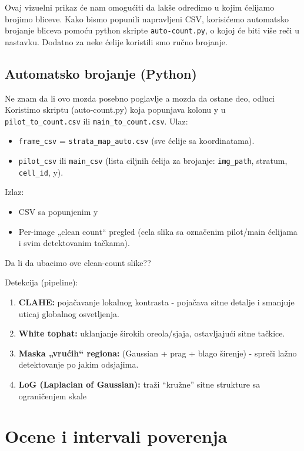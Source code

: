\documentclass[a4paper,12pt]{article}
\begin{document}
\noindent
Ovaj vizuelni prikaz će nam omogućiti da lakše odredimo u kojim ćelijamo brojimo bliceve. 
Kako bismo popunili napravljeni CSV, korisićemo automatsko brojanje bliceva pomoću python skripte \texttt{auto-count.py}, o kojoj će biti više
reči u nastavku. Dodatno za neke ćelije koristili smo ručno brojanje.


\subsection{Automatsko brojanje (Python)}
Ne znam da li ovo mozda posebno poglavlje a mozda da ostane deo, odluci
\newline
\newline
\noindent
Koristimo skriptu (auto-count.py) koja popunjava kolonu y u \texttt{pilot\_to\_count.csv} ili \texttt{main\_to\_count.csv}.
\newline
\noindent Ulaz: 
\begin{itemize}
	\item \texttt{frame\_csv} = \texttt{strata\_map\_auto.csv} (sve ćelije sa koordinatama).
	\item \texttt{pilot\_csv} ili \texttt{main\_csv} (lista ciljnih ćelija za brojanje: \texttt{img\_path}, stratum, \texttt{cell\_id}, y).
\end{itemize}
\noindent Izlaz:
\begin{itemize}
	\item CSV sa popunjenim y
	\item Per-image „clean count“ pregled (cela slika sa označenim pilot/main ćelijama i svim detektovanim tačkama).
\end{itemize}

Da li da ubacimo ove clean-count slike??

\noindent
Detekcija (pipeline):
\begin{enumerate}
  \item \textbf{CLAHE:} pojačavanje lokalnog kontrasta - pojačava sitne detalje i smanjuje uticaj globalnog osvetljenja.
  \item \textbf{White tophat:} uklanjanje širokih oreola/sjaja, ostavljajući sitne tačkice.
  \item \textbf{Maska „vrućih“ regiona:} (Gaussian + prag + blago širenje) - spreči lažno detektovanje po jakim odsjajima.
  \item \textbf{LoG (Laplacian of Gaussian):} traži “kružne” sitne strukture sa ograničenjem skale
\end{enumerate}

\section{Ocene i intervali poverenja}
\end{document}

